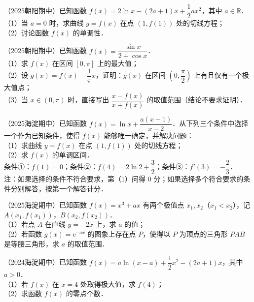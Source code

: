 
\begin{example}
（2025朝阳期中）已知函数 $f(x)=2\ln x-(2a+1)x+\dfrac{1}{2}ax^2$，其中 $a\in\mathbb{R}$．\\
（1）当 $a=0$ 时，求曲线 $y=f(x)$ 在点 $(1,f(1))$ 处的切线方程；\\
（2）讨论函数 $f(x)$ 的单调性．
\end{example}

\begin{example}
（2025朝阳期中）已知函数 $f(x)=\dfrac{\sin x}{2+\cos x}$．\\
（1）求 $f(x)$ 在区间 $[0,\pi]$ 上的最大值；\\
（2）设 $g(x)=f(x)-\dfrac{1}{\pi}x$，证明：$g(x)$ 在区间 $\left(0,\dfrac{\pi}{2}\right)$ 上有且仅有一个极大值点；\\
（3）当 $x\in(0,\pi)$ 时，直接写出 $\dfrac{x-f(x)}{x+f(x)}$ 的取值范围（结论不要求证明）．
\end{example}

\begin{example}
（2025海淀期中）已知函数 $f(x)=\ln x+\dfrac{a(x-1)}{x-2}$．从下列三个条件中选择一个作为已知条件，使得 $f(x)$ 能够唯一确定，并解决问题：\\
（1）求曲线 $y=f(x)$ 在点 $(1,f(1))$ 处的切线方程；\\
（2）求 $f(x)$ 的单调区间．\\
条件①：$f(1)=0$；条件②：$f(4)=2\ln 2+\dfrac{3}{2}$；条件③：$f'(3)=-\dfrac{2}{3}$．\\
注：如果选择的条件不符合要求，第（1）问得 $0$ 分；如果选择多个符合要求的条件分别解答，按第一个解答计分．
\end{example}

\begin{example}
（2025海淀期中）已知函数 $f(x)=x^3+ax$ 有两个极值点 $x_1,x_2$（$x_1<x_2$），记 $A(x_1,f(x_1))$，$B(x_2,f(x_2))$．\\
（1）若点 $A$ 在直线 $y=-2x$ 上，求 $a$ 的值；\\
（2）若函数 $g(x)=\mathrm{e}^{-ax}$ 的图象上存在点 $P$，使得以 $P$ 为顶点的三角形 $PAB$ 是等腰三角形，求 $a$ 的取值范围．
\end{example}

\begin{example}
（2024海淀期中）已知函数 $f(x)=a\ln(x-a)+\dfrac{1}{2}x^2-(2a+1)x$，其中 $a>0$．\\
（1）若 $f(x)$ 在 $x=4$ 处取得极大值，求 $f(4)$；\\
（2）求函数 $f(x)$ 的零点个数．
\end{example}

